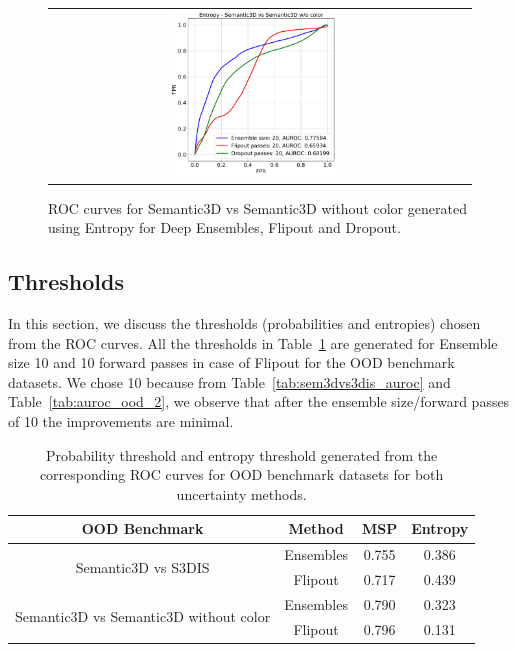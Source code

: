 \begin{figure}
\begin{tabular}{cc}
            \includegraphics[width = 0.42\textwidth, height= 0.3\textheight]{images/AUROC/Entropy_cnc_20.pdf} &
            \\
        \end{tabular}
        \caption{ROC curves for Semantic3D vs Semantic3D without color generated using Entropy for Deep Ensembles, Flipout and Dropout.}
        \label{fig:roc_ent_ood_2}
    \end{figure}

    \subsection{Thresholds}
    In this section, we discuss the thresholds  (probabilities and entropies) chosen from the ROC curves.
    All the thresholds in Table~\ref{tab:thresholds} are generated for Ensemble size 10 and 10 forward passes in case of Flipout for the OOD benchmark datasets.
    We chose 10 because from Table~\ref{tab:sem3dvs3dis_auroc} and Table~\ref{tab:auroc_ood_2}, we observe that after the ensemble size/forward passes of 10 the improvements are  minimal.
    \begin{table}[]
        \centering
        \begin{tabular}{cccc}
            \hline
            OOD Benchmark                                           & Method    & MSP   & Entropy \\ \hline
            \multirow{2}{*}{Semantic3D vs S3DIS}                    & Ensembles & 0.755 & 0.386   \\
                                                                    & Flipout   & 0.717 & 0.439   \\ \hline
            \multirow{2}{*}{Semantic3D vs Semantic3D without color} & Ensembles & 0.790 & 0.323   \\ 
                                                                    & Flipout   & 0.796 & 0.131   \\ \hline
        \end{tabular}
        \caption{Probability threshold and entropy threshold generated from the corresponding ROC curves for OOD benchmark datasets for both uncertainty methods.}
        \label{tab:thresholds}
    \end{table}

